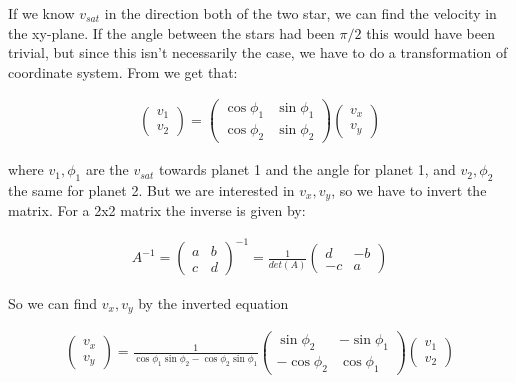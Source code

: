 \documentclass[a4paper, 10pt]{article}
\begin{document}
If we know $v_{sat}$ in the direction both of the two star, we can find the velocity in the xy-plane. If the angle between the stars had been $\pi/2$ this would have been trivial, but since this isn't necessarily the case, we have to do a transformation of coordinate system. From \cite{part4} we get that:

\begin{align}
\begin{pmatrix}
v_1\\
v_2
\end{pmatrix}
=
\begin{pmatrix}
\cos \phi_1 & \sin \phi_1 \\
\cos \phi_2 & \sin \phi_2 
\end{pmatrix}
\begin{pmatrix}
v_x\\
v_y
\end{pmatrix}
\end{align}  

where $v_1,\phi_1$ are the $v_{sat}$ towards planet 1 and the angle for planet 1, and $v_2,\phi_2$ the same for planet 2. But we are interested in $v_x,
v_y$, so we have to invert the matrix. For a 2x2 matrix the inverse is given by:

\begin{align}
A^{-1} = 
\begin{pmatrix}
a & b \\
c & d 
\end{pmatrix}^{-1}
=
\frac{1}{det(A)} 
\begin{pmatrix}
d & -b \\
-c & a 
\end{pmatrix}
\end{align}

So we can find $v_x,v_y$ by the inverted equation

\begin{align}
\begin{pmatrix}
v_x\\
v_y
\end{pmatrix}
=
\frac{1}{\cos \phi_1 \sin \phi_2 - \cos \phi_2 \sin \phi_1}
\begin{pmatrix}
\sin \phi_2 & -\sin \phi_1 \\
-\cos \phi_2 & \cos \phi_1 
\end{pmatrix}
\begin{pmatrix}
v_1\\
v_2
\end{pmatrix}
\end{align}
\end{document}
